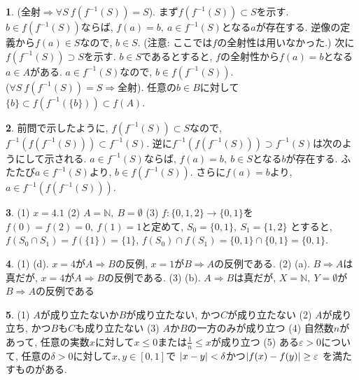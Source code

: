 \documentclass{article}
\theoremstyle{definition}
\newtheorem{ans}{}
\numberwithin{ans}{subsection}
\DeclarePairedDelimiter{\abs}{\lvert}{\rvert}
\begin{document}
\begin{ans}
  (全射$\Rightarrow \forall S\ f(f^{-1}(S)) = S$).
  まず$f(f^{-1}(S)) \subset S$を示す.
  $b \in f(f^{-1}(S))$ならば,
  $f(a) = b,\ a \in f^{-1}(S)$となる$a$が存在する.
  逆像の定義から$f(a) \in S$なので, $b \in S$.
  (注意: ここでは$f$の全射性は用いなかった.)
  次に$f(f^{-1}(S)) \supset S$を示す.
  $b \in S$であるとすると, $f$の全射性から$f(a) = b$となる$a \in A$がある.
  $a \in f^{-1}(S)$なので, $b \in f(f^{-1}(S))$.
  \\
  ($\forall S\ f(f^{-1}(S)) = S \Rightarrow$全射).
  任意の$b \in B$に対して$\{b\} \subset f(f^{-1}(\{b\})) \subset f(A)$.
\end{ans}

\begin{ans}
  前問で示したように, $f(f^{-1}(S)) \subset S$なので,
  $f^{-1}(f(f^{-1}(S))) \subset f^{-1}(S)$.
  逆に$f^{-1}(f(f^{-1}(S))) \supset f^{-1}(S)$は次のようにして示される.
  $a \in f^{-1}(S)$ならば, $f(a) = b,\ b \in S$となる$b$が存在する.
  ふたたび$a \in f^{-1}(S)$より, $b \in f(f^{-1}(S))$.
  さらに$f(a) = b$より, $a \in f^{-1}(f(f^{-1}(S)))$.
\end{ans}

\begin{ans}
  (1) $x = 4.1$
  (2) $A = \mathbb{N},\ B = \emptyset$
  (3) $f: \{0, 1, 2\} \rightarrow \{0, 1\}$を
  $f(0) = f(2) = 0,\ f(1) = 1$と定めて,
  $S_0 = \{0, 1\},\ S_1 = \{1, 2\}$
  とすると, $f(S_0 \cap S_1) = f(\{1\}) = \{1\}$,
  $f(S_0) \cap f(S_1) = \{0, 1\} \cap \{0, 1\} = \{0, 1\}$.
\end{ans}

\begin{ans}
  (1) (d).
  $x = 4$が$A \Rightarrow B$の反例,
  $x = 1$が$B \Rightarrow A$の反例である.
  (2) (a).
  $B \Rightarrow A$は真だが,
  $x = 4$が$A \Rightarrow B$の反例である.
  (3) (b). $A \Rightarrow B$は真だが,
  $X = \mathbb{N},\ Y = \emptyset$が$B \Rightarrow A$の反例である
\end{ans}

\begin{ans}
  (1) $A$が成り立たないか$B$が成り立たない, かつ$C$が成り立たない
  (2) $A$が成り立ち, かつ$B$も$C$も成り立たない
  (3) $A$か$B$の一方のみが成り立つ
  (4) 自然数$n$があって, 任意の実数$x$に対して$x \le 0$または$\frac{1}{n} \le x$が成り立つ
  (5) ある$\varepsilon > 0$について, 任意の$\delta > 0$に対して$x, y \in [0, 1]$で
  $\abs{x - y} < \delta$かつ$\abs{f(x) - f(y)} \ge \varepsilon$
  を満たすものがある.
\end{ans}
\end{document}
